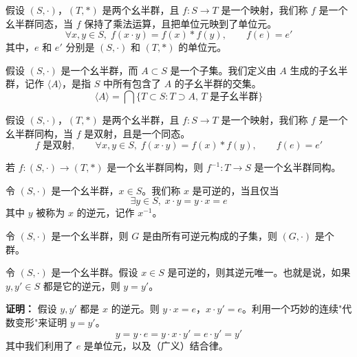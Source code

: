 \begin{definition}[幺半群同态（定义 1.5）]
假设 $(S,\cdot)$，$(T,*)$ 是两个幺半群，且 $f:S\to T$ 是一个映射，我们称 $f$ 是一个幺半群同态，当 $f$ 保持了乘法运算，且把单位元映到了单位元。
\[
\forall x,y\in S,\;f(x\cdot y)=f(x)*f(y),\qquad f(e)=e'
\]
其中，$e$ 和 $e'$ 分别是 $(S,\cdot)$ 和 $(T,*)$ 的单位元。
\end{definition}

\begin{definition}[由子集生成的子幺半群（定义 1.6）]
假设 $(S,\cdot)$ 是一个幺半群，而 $A\subset S$ 是一个子集。我们定义由 $A$ 生成的子幺半群，记作 $\langle A\rangle$，是指 $S$ 中所有包含了 $A$ 的子幺半群的交集。
\[
\langle A\rangle=\bigcap\{T\subset S:T\supset A,\,T\text{ 是子幺半群}\}
\]
\end{definition}

\begin{definition}[幺半群同构（定义 1.7）]
假设 $(S,\cdot)$，$(T,*)$ 是两个幺半群，且 $f:S\to T$ 是一个映射，我们称 $f$ 是一个幺半群同构，当 $f$ 是双射，且是一个同态。
\[
f\text{ 是双射},\qquad\forall x,y\in S,\;f(x\cdot y)=f(x)*f(y),\qquad f(e)=e'
\]
\end{definition}

\begin{proposition}[命题 1.6]
若 $f:(S,\cdot)\to(T,*)$ 是一个幺半群同构，则 $f^{-1}:T\to S$ 是一个幺半群同构。
\end{proposition}

\begin{definition}[逆元（定义 1.8）]
令 $(S,\cdot)$ 是一个幺半群，$x\in S$。我们称 $x$ 是可逆的，当且仅当
\[
\exists y\in S,\;x\cdot y=y\cdot x=e
\]
其中 $y$ 被称为 $x$ 的逆元，记作 $x^{-1}$。
\end{definition}

\begin{lemma}[引理 1.1：幺半群的逆元构成群]
令 $(S,\cdot)$ 是一个幺半群，则 $G$ 是由所有可逆元构成的子集，则 $(G,\cdot)$ 是个群。
\end{lemma}

\begin{proposition}[命题 1.7：逆元唯一]
令 $(S,\cdot)$ 是一个幺半群。假设 $x\in S$ 是可逆的，则其逆元唯一。也就是说，如果 $y,y'\in S$ 都是它的逆元，则 $y=y'$。

\textbf{证明：} 假设 $y,y'$ 都是 $x$ 的逆元。则 $y\cdot x=e$，$x\cdot y'=e$。利用一个巧妙的连续"代数变形"来证明 $y=y'$。
\[
y=y\cdot e=y\cdot x\cdot y'=e\cdot y'=y'
\]
其中我们利用了 $e$ 是单位元，以及（广义）结合律。
\end{proposition}


